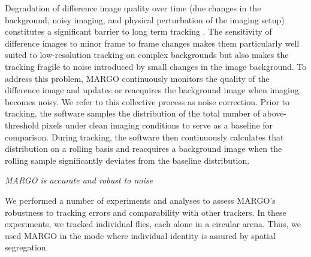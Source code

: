\documentclass[10pt]{article}
\begin{document}
\begin{multicols}{2}
Degradation of difference image quality over time (due changes in the background, noisy imaging, and physical perturbation of the imaging setup) constitutes a significant barrier to long term tracking \cite{Sridhar_Tracktor_2018}. The sensitivity of difference images to minor frame to frame changes makes them particularly well suited to low-resolution tracking on complex backgrounds \cite{Liu_A_2018} but also makes the tracking fragile to noise introduced by small changes in the image background. To address this problem, MARGO continuously monitors the quality of the difference image and updates or reacquires the background image when imaging becomes noisy. We refer to this collective process as noise correction. Prior to tracking, the software samples the distribution of the total number of above-threshold pixels under clean imaging conditions to serve as a baseline for comparison.  During tracking, the software then continuously calculates that distribution on a rolling basis and reacquires a background image when the rolling sample significantly deviates from the baseline distribution.

\textit{MARGO is accurate and robust to noise}

We performed a number of experiments and analyses to assess MARGO's robustness to tracking errors and comparability with other trackers. In these experiments, we tracked individual flies, each alone in a circular arena. Thus, we used MARGO in the mode where individual identity is assured by spatial segregation.


\end{multicols}
\end{document}
